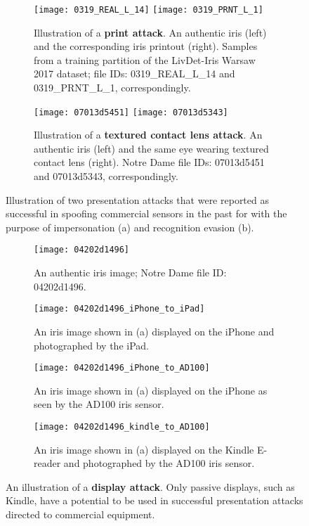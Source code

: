 \documentclass[format=acmsmall, review=false, timestamp=false]{acmart}
\begin{document}
\begin{figure}[!htb]
    \centering
    \begin{subfigure}[t]{0.485\textwidth}
        \texttt{[image: 0319\_REAL\_L\_14]}\hskip3mm
        \texttt{[image: 0319\_PRNT\_L\_1]}
        \caption{Illustration of a {\bf print attack}. An authentic iris (left) and the corresponding iris printout (right). Samples from a training partition of the {\sf LivDet-Iris Warsaw 2017} dataset; file IDs: 0319\_REAL\_L\_14 and 0319\_PRNT\_L\_1, correspondingly.}
    \end{subfigure}\hfill
    \begin{subfigure}[t]{0.484\textwidth}
        \texttt{[image: 07013d5451]}\hskip3mm
        \texttt{[image: 07013d5343]}
        \caption{Illustration of a {\bf textured contact lens attack}. An authentic iris (left) and the same eye wearing textured contact lens (right). Notre Dame file IDs: 07013d5451 and 07013d5343, correspondingly.}
    \end{subfigure}
    \caption{Illustration of two presentation attacks that were reported as successful in spoofing commercial sensors in the past for with the purpose of impersonation (a) and recognition evasion (b).}
    \label{fig:samples:print_and_lens}    
\end{figure}  

\begin{figure*}[!htb]
    \centering
    \begin{subfigure}[t]{0.21\textwidth}
        \texttt{[image: 04202d1496]}
        \caption{An authentic iris image; Notre Dame file ID: 04202d1496.}
    \end{subfigure}\hfill
    \begin{subfigure}[t]{0.255\textwidth}    
        \texttt{[image: 04202d1496\_iPhone\_to\_iPad]}
        \caption{An iris image shown in (a) displayed on the iPhone and photographed by the iPad.}
    \end{subfigure}\hfill
    \begin{subfigure}[t]{0.26\textwidth}  
        \texttt{[image: 04202d1496\_iPhone\_to\_AD100]}
        \caption{An iris image shown in (a) displayed on the iPhone as seen by the AD100 iris sensor.}
    \end{subfigure}\hfill
    \begin{subfigure}[t]{0.21\textwidth}
        \texttt{[image: 04202d1496\_kindle\_to\_AD100]}
        \caption{An iris image shown in (a) displayed on the Kindle E-reader and photographed by the AD100 iris sensor.}
    \end{subfigure}
    \caption{An illustration of a {\bf display attack}. Only passive displays, such as Kindle, have a potential to be used in successful presentation attacks directed to commercial equipment.}
    \label{fig:samples:display}
\end{figure*}
\end{document}
